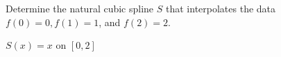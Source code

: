 %
%
%
%
%
%
\begin{myexercise}%
Determine the natural cubic spline $S$ that interpolates the data $f(0)=0, f(1)=1$, and $f(2)=2$.
\begin{mysolution}
$S(x)=x$ on $[0,2]$
\end{mysolution}
\end{myexercise}




